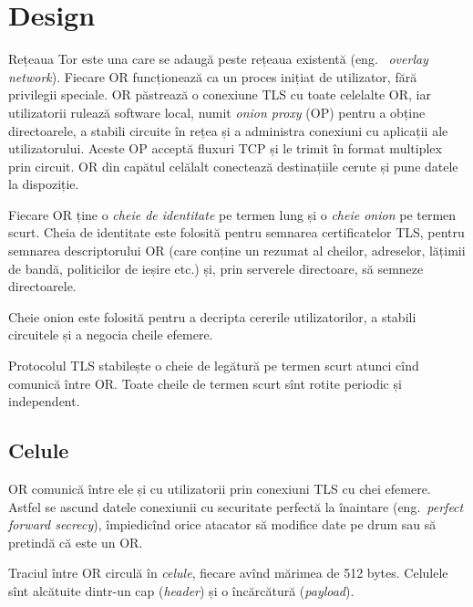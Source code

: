 
\chapter{Design}

\indent\indent Rețeaua Tor este una care se adaugă peste rețeaua existentă (eng.\ %
\emph{overlay network}).  Fiecare OR funcționează
ca un proces inițiat de utilizator, fără privilegii speciale. OR păstrează
o conexiune TLS cu toate celelalte OR, iar utilizatorii rulează
software local, numit \emph{onion proxy} (OP)  pentru
a obține directoarele, a stabili circuite în rețea și a administra
conexiuni cu aplicații ale utilizatorului. Aceste OP acceptă fluxuri TCP
și le trimit în format multiplex prin circuit. OR din capătul celălalt
conectează destinațiile cerute și pune datele la dispoziție.

Fiecare OR ține o \textit{cheie de identitate} pe termen lung și o \textit{cheie onion}
pe termen scurt.  
Cheia de identitate este folosită pentru semnarea
certificatelor TLS, pentru semnarea descriptorului OR (care conține un
rezumat al cheilor, adreselor, lățimii de bandă, politicilor de ieșire etc.) și,
prin serverele directoare, să semneze directoarele.

Cheie onion este folosită pentru a decripta cererile utilizatorilor, a stabili
circuitele și a negocia cheile efemere.

Protocolul TLS stabilește o cheie de legătură pe termen scurt
atunci cînd comunică între OR. Toate cheile de termen scurt sînt rotite periodic
și independent.

\section{Celule}

\indent\indent OR comunică între ele și cu utilizatorii prin conexiuni TLS cu chei efemere.
Astfel se ascund datele conexiunii cu securitate perfectă la înaintare
(eng.\ \emph{perfect forward secrecy}), împiedicînd orice atacator să
modifice date pe drum sau să pretindă că este un OR.

Traciul între OR circulă în \emph{celule}, fiecare avînd mărimea de 512 bytes.
Celulele sînt alcătuite dintr-un cap (\emph{header}) și o încărcătură
(\emph{payload}). 

